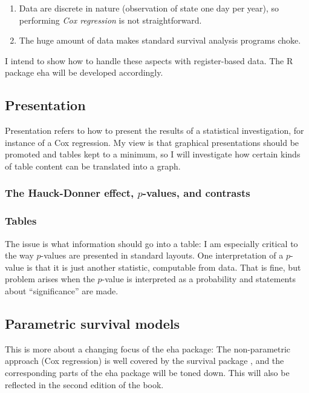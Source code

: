 \documentclass[a4paper,11pt]{article}
\begin{document}
\begin{enumerate}

\item Data are discrete in nature (observation of state one day per year),
  so performing \emph{Cox regression} is not straightforward.
\item The huge amount of data makes standard survival analysis programs
  choke.
\end{enumerate}  

I intend to show how to handle these aspects with register-based data. The
R package eha \citep{eha} will be developed accordingly.

\subsection{Presentation}

Presentation refers to how to present the results of a statistical
investigation, for instance of a Cox regression. My view is that graphical
presentations should be promoted and tables kept to a minimum, so I will
investigate how certain kinds of table content can be translated into a graph.

\subsubsection{The Hauck-Donner effect, $p$-values, and contrasts}

\subsubsection{Tables}

The issue is what information should go into a table: I am especially
critical to the way $p$-values are presented in standard layouts.  One
interpretation of a $p$-value is that it is just another statistic,
computable from data. That is fine, but problem arises when the $p$-value is
interpreted as a probability and statements about ``significance'' are made.

\subsection{Parametric survival models}

This is more about a changing focus of the eha package: The non-parametric
approach (Cox regression) is well covered by the survival package
\citep{survival}, and the corresponding parts of the eha package will be
toned down. This will also be reflected in the second edition of the book. 
\end{document}
